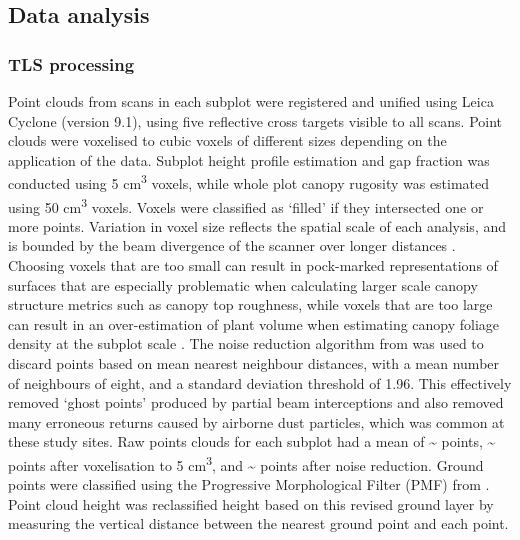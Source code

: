 \documentclass[11pt,a4paper]{article}
\begin{document}
\subsection{Data analysis}

\subsubsection{TLS processing}

Point clouds from scans in each subplot were registered and unified using Leica Cyclone (version 9.1), using five reflective cross targets visible to all scans. Point clouds were voxelised to cubic voxels of different sizes depending on the application of the data. Subplot height profile estimation and gap fraction was conducted using 5 cm\textsuperscript{3} voxels, while whole plot canopy rugosity was estimated using 50 cm\textsuperscript{3} voxels. Voxels were classified as `filled' if they intersected one or more points. Variation in voxel size reflects the spatial scale of each analysis, and is bounded by the beam divergence of the scanner over longer distances \citep{Cifuentes2014}. Choosing voxels that are too small can result in pock-marked representations of surfaces that are especially problematic when calculating larger scale canopy structure metrics such as canopy top roughness, while voxels that are too large can result in an over-estimation of plant volume when estimating canopy foliage density at the subplot scale \citep{Seidel2012, Cifuentes2014}. The noise reduction algorithm from \citet{Rusu2008} was used to discard points based on mean nearest neighbour distances, with a mean number of neighbours of eight, and a standard deviation threshold of 1.96. This effectively removed `ghost points' produced by partial beam interceptions and also removed many erroneous returns caused by airborne dust particles, which was common at these study sites. Raw points clouds for each subplot had a mean of \textasciitilde{}\rawpt{} points, \textasciitilde{}\voxelpt{} points after voxelisation to 5 cm\textsuperscript{3}, and \textasciitilde{}\subpt{} points after noise reduction. Ground points were classified using the Progressive Morphological Filter (PMF) from \citet{Zhang2003}. Point cloud height was reclassified height based on this revised ground layer by measuring the vertical distance between the nearest ground point and each point.
\end{document}
